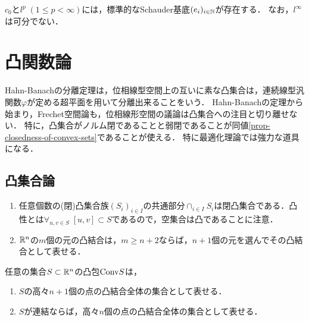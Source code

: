 \documentclass[uplatex,dvipdfmx]{jsreport}
\begin{document}
\begin{example}
    $c_0$と$l^p\;(1\le p<\infty)$には，標準的なSchauder基底$(e_i)_{i\in\mathbb{N}}$が存在する．
    なお，$l^\infty$は可分でない．
\end{example}

\section{凸関数論}

\begin{tcolorbox}[colframe=ForestGreen, colback=ForestGreen!10!white,breakable,colbacktitle=ForestGreen!40!white,coltitle=black,fonttitle=\bfseries\sffamily,
title=凸解析の整備]
    Hahn-Banachの分離定理は，位相線型空間上の互いに素な凸集合は，連続線型汎関数$\varphi$が定める超平面を用いて分離出来ることをいう．
    Hahn-Banachの定理から始まり，Frechet空間論も，位相線形空間の議論は凸集合への注目と切り離せない．
    特に，凸集合がノルム閉であることと弱閉であることが同値\ref{prop-closedness-of-convex-sets}であることが使える．
    特に最適化理論では強力な道具になる．
\end{tcolorbox}

\subsection{凸集合論}



\begin{lemma}\mbox{}
    \begin{enumerate}
        \item 任意個数の(閉)凸集合族$(S_i)_{i\in I}$の共通部分$\cap_{i\in I}S_i$は閉凸集合である．凸性とは$\forall_{u,v\in S}\;[u,v]\subset S$であるので，空集合は凸であることに注意．
        \item $\mathbb{R}^n$の$m$個の元の凸結合は，$m\ge n+2$ならば，$n+1$個の元を選んでその凸結合として表せる．
    \end{enumerate}
\end{lemma}

\begin{theorem}[Caratheodory]
    任意の集合$S\subset\mathbb{R}^n$の凸包$\mathrm{Conv} S$は，
    \begin{enumerate}
        \item $S$の高々$n+1$個の点の凸結合全体の集合として表せる．
        \item $S$が連結ならば，高々$n$個の点の凸結合全体の集合として表せる．
    \end{enumerate}
\end{theorem}
\end{document}
